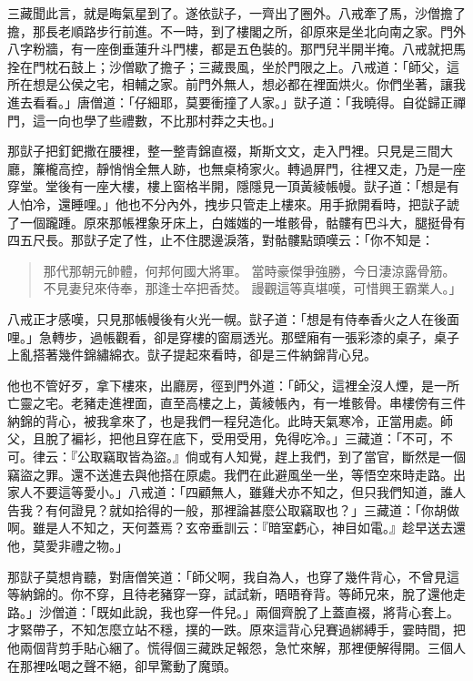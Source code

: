 三藏聞此言，就是晦氣星到了。遂依獃子，一齊出了圈外。八戒牽了馬，沙僧擔了擔，那長老順路步行前進。不一時，到了樓閣之所，卻原來是坐北向南之家。門外八字粉牆，有一座倒垂蓮升斗門樓，都是五色裝的。那門兒半開半掩。八戒就把馬拴在門枕石鼓上；沙僧歇了擔子；三藏畏風，坐於門限之上。八戒道：「師父，這所在想是公侯之宅，相輔之家。前門外無人，想必都在裡面烘火。你們坐著，讓我進去看看。」唐僧道：「仔細耶，莫要衝撞了人家。」獃子道：「我曉得。自從歸正禪門，這一向也學了些禮數，不比那村莽之夫也。」

那獃子把釘鈀撒在腰裡，整一整青錦直裰，斯斯文文，走入門裡。只見是三間大廳，簾櫳高控，靜悄悄全無人跡，也無桌椅家火。轉過屏門，往裡又走，乃是一座穿堂。堂後有一座大樓，樓上窗格半開，隱隱見一頂黃綾帳幔。獃子道：「想是有人怕冷，還睡哩。」他也不分內外，拽步只管走上樓來。用手掀開看時，把獃子諕了一個躘踵。原來那帳裡象牙床上，白媸媸的一堆骸骨，骷髏有巴斗大，腿挺骨有四五尺長。那獃子定了性，止不住腮邊淚落，對骷髏點頭嘆云：「你不知是：
\begin{quote}
那代那朝元帥體，何邦何國大將軍。
當時豪傑爭強勝，今日淒涼露骨筋。
不見妻兒來侍奉，那逢士卒把香焚。
謾觀這等真堪嘆，可惜興王霸業人。」
\end{quote}

八戒正才感嘆，只見那帳幔後有火光一幌。獃子道：「想是有侍奉香火之人在後面哩。」急轉步，過帳觀看，卻是穿樓的窗扇透光。那壁廂有一張彩漆的桌子，桌子上亂搭著幾件錦繡綿衣。獃子提起來看時，卻是三件納錦背心兒。

他也不管好歹，拿下樓來，出廳房，徑到門外道：「師父，這裡全沒人煙，是一所亡靈之宅。老豬走進裡面，直至高樓之上，黃綾帳內，有一堆骸骨。串樓傍有三件納錦的背心，被我拿來了，也是我們一程兒造化。此時天氣寒冷，正當用處。師父，且脫了褊衫，把他且穿在底下，受用受用，免得吃冷。」三藏道：「不可，不可。律云：『公取竊取皆為盜。』倘或有人知覺，趕上我們，到了當官，斷然是一個竊盜之罪。還不送進去與他搭在原處。我們在此避風坐一坐，等悟空來時走路。出家人不要這等愛小。」八戒道：「四顧無人，雖雞犬亦不知之，但只我們知道，誰人告我？有何證見？就如拾得的一般，那裡論甚麼公取竊取也？」三藏道：「你胡做啊。雖是人不知之，天何蓋焉？玄帝垂訓云：『暗室虧心，神目如電。』趁早送去還他，莫愛非禮之物。」

那獃子莫想肯聽，對唐僧笑道：「師父啊，我自為人，也穿了幾件背心，不曾見這等納錦的。你不穿，且待老豬穿一穿，試試新，晤晤脊背。等師兄來，脫了還他走路。」沙僧道：「既如此說，我也穿一件兒。」兩個齊脫了上蓋直裰，將背心套上。才緊帶子，不知怎麼立站不穩，撲的一跌。原來這背心兒賽過綁縛手，霎時間，把他兩個背剪手貼心綑了。慌得個三藏跌足報怨，急忙來解，那裡便解得開。三個人在那裡吆喝之聲不絕，卻早驚動了魔頭。

